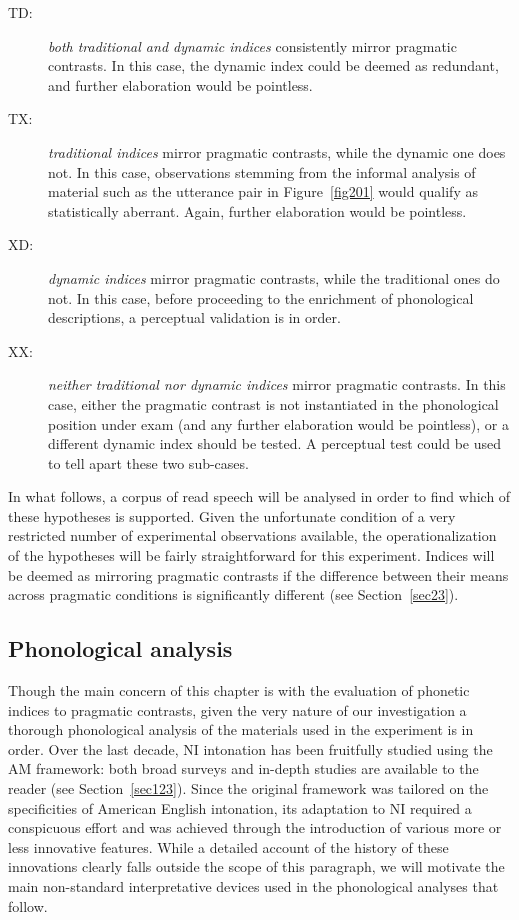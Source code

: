 \begin{description}
   \item[TD:] \textit{both traditional and dynamic indices} consistently mirror pragmatic contrasts. In this case, the dynamic index could be deemed as redundant, and further elaboration would be pointless.
   \item[TX:] \textit{traditional indices} mirror pragmatic contrasts, while the dynamic one does not. In this case, observations stemming from the informal analysis of material such as the utterance pair in Figure~\ref{fig201} would qualify as statistically aberrant. Again, further elaboration would be pointless.
   \item[XD:] \textit{dynamic indices} mirror pragmatic contrasts, while the traditional ones do not. In this case, before proceeding to the enrichment of phonological descriptions, a perceptual validation is in order.
   \item[XX:] \textit{neither traditional nor dynamic indices} mirror pragmatic contrasts. In this case, either the pragmatic contrast is not instantiated in the phonological position under exam (and any further elaboration would be pointless), or a different dynamic index should be tested. A perceptual test could be used to tell apart these two sub-cases.
\end{description}

In what follows, a corpus of read speech will be analysed in order to find which of these hypotheses is supported. Given the unfortunate condition of a very restricted number of experimental observations available, the operationalization of the hypotheses will be fairly straightforward for this experiment. Indices will be deemed as mirroring pragmatic contrasts if the difference between their means across pragmatic conditions is significantly different (see Section~\ref{sec23}).

\subsection{Phonological analysis}\label{sec212}
Though the main concern of this chapter is with the evaluation of phonetic indices to pragmatic contrasts, given the very nature of our investigation a thorough phonological analysis of the materials used in the experiment is in order.
Over the last decade, NI intonation has been fruitfully studied using the AM framework: both broad surveys and in-depth studies are available to the reader (see Section~\ref{sec123}). Since the original framework was tailored on the specificities of American English intonation, its adaptation to NI required a conspicuous effort and was achieved through the introduction of various more or less innovative features. While a detailed account of the history of these innovations clearly falls outside the scope of this paragraph, we will motivate the main non-standard interpretative devices used in the phonological analyses that follow.

